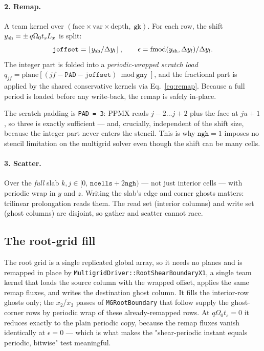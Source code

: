 \documentclass[11pt]{article}
\newcommand{\code}[1]{\texttt{#1}}
\newcommand{\fn}[1]{\texttt{\small #1}}
\newcommand{\Om}{\Omega_0}
\begin{document}
\paragraph{2. Remap.} A team kernel over $(\text{face}\times\text{var}\times\text{depth},\;
\code{gk})$. For each row, the shift $y_{\rm sh} = \pm\, q\Om t_s L_x$ is split:
\begin{equation}
  \code{joffset} = \left\lfloor y_{\rm sh}/\Delta y_l \right\rfloor, \qquad
  \epsilon = \operatorname{fmod}(y_{\rm sh}, \Delta y_l)/\Delta y_l .
\end{equation}
The integer part is folded into a \emph{periodic-wrapped scratch load}
$q_{jf} = \text{plane}[(jf - \code{PAD} - \code{joffset}) \bmod \code{gny}]$, and the
fractional part is applied by the shared conservative kernels via
Eq.~\eqref{eq:remap}. Because a full period is loaded before any write-back, the
remap is safely in-place.

The scratch padding is \code{PAD = 3}: PPMX reads $j-2 \dots j+2$ plus the face at
$ju+1$, so three is exactly sufficient --- and, crucially, independent of the shift
size, because the integer part never enters the stencil. This is why $\code{ngh} = 1$
imposes no stencil limitation on the multigrid solver even though the shift can be
many cells.

\paragraph{3. Scatter.} Over the \emph{full} slab $k,j \in [0,\, \code{ncells}+2\code{ngh})$
--- not just interior cells --- with periodic wrap in $y$ and $z$. Writing the slab's
edge and corner ghosts matters: trilinear prolongation reads them. The read set
(interior columns) and write set (ghost columns) are disjoint, so gather and scatter
cannot race.

\subsection{The root-grid fill}

The root grid is a single replicated global array, so it needs no planes and is
remapped in place by \fn{MultigridDriver::RootShearBoundaryX1}, a single team kernel
that loads the source column with the wrapped offset, applies the same remap fluxes,
and writes the destination ghost column. It fills the interior-row ghosts only; the
$x_2$/$x_3$ passes of \fn{MGRootBoundary} that follow supply the ghost-corner rows by
periodic wrap of these already-remapped rows. At $q\Om t_s = 0$ it reduces exactly to
the plain periodic copy, because the remap fluxes vanish identically at $\epsilon = 0$
--- which is what makes the "shear-periodic instant equals periodic, bitwise" test
meaningful.
\end{document}
